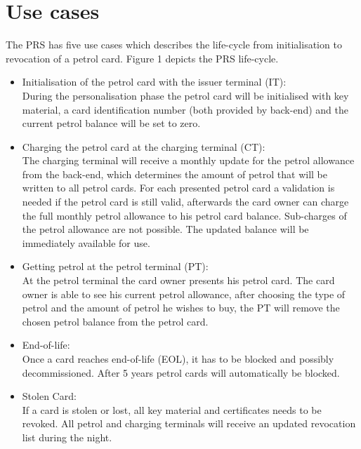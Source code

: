 
\section{Use cases}
The PRS has five use cases which describes the life-cycle from initialisation to revocation of a petrol card. Figure 1 depicts the PRS life-cycle. 

\begin{itemize}
\item Initialisation of the petrol card with the issuer terminal (IT):\\
During the personalisation phase the petrol card will be initialised with key material, a card identification number (both provided by back-end) and the current petrol balance will be set to zero. 

\item Charging the petrol card at the charging terminal (CT): \\
The charging terminal will receive a monthly update for the petrol allowance from the back-end, which determines the amount of petrol that will be written to all petrol cards. For each presented petrol card a validation is needed if the petrol card is still valid, afterwards the card owner can charge the full monthly petrol allowance to his petrol card balance. Sub-charges of the petrol allowance are not possible. The updated balance will be immediately available for use. 

\item Getting petrol at the petrol terminal (PT):\\
At the petrol terminal the card owner presents his petrol card. The card owner is able to see his current petrol allowance, after choosing the type of petrol and the amount of petrol he wishes to buy, the PT will remove the chosen petrol balance from the petrol card. %

\item End-of-life: \\
Once a card reaches end-of-life (EOL), it has to be blocked and possibly decommissioned. After 5 years petrol cards will automatically be blocked.

\item Stolen Card: \\
If a card is stolen or lost, all key material and certificates needs to be revoked. All petrol and charging terminals will receive an updated revocation list during the night. 


\end{itemize}
